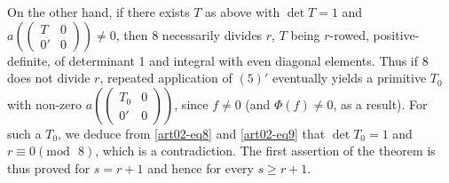On the other hand, if there exists $T$ as above with $\det T=1$ and
$a\left(\left(\begin{smallmatrix} T & 0\\ 0' &
0\end{smallmatrix}\right)\right)\neq 0$, then $8$ necessarily divides
$r$, $T$ being $r$-rowed, positive-definite, of determinant 1 and
integral with even diagonal elements. Thus if 8 does not divide $r$,
repeated application of $(5)'$ eventually yields a primitive $T_{0}$
with non-zero $a\left(\left(\begin{smallmatrix} T_{0} & 0\\ 0' &
0\end{smallmatrix}\right)\right)$, since $f\neq 0$ (and $\Phi(f)\neq
0$, as a result).  For such a $T_{0}$, we deduce
from \eqref{art02-eq8} and \eqref{art02-eq9} that $\det T_{0}=1$ and
$r\equiv 0(\text{mod~ }8)$, which is a contradiction. The first
assertion of the theorem is thus proved for $s=r+1$ and hence for
every $s\geq r+1$.


